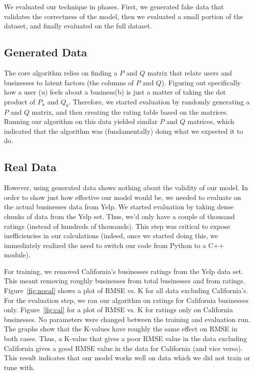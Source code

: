 We evaluated our technique in phases. First, we generated fake data that
validates the correctness of the model, then we evaluated a small portion of
the dataset, and finally evaluated on the full dataset.

\subsection{Generated Data}
The core algorithm relies on finding a $P$ and $Q$ matrix that relate users and
businesses to latent factors (the columns of $P$ and $Q$).  Figuring out
specifically how a user (u) feels about a business(b) is just a matter of
taking the dot product of $P_u$ and $Q_b$.  Therefore, we started evaluation by
randomly generating a $P$ and $Q$ matrix, and then creating the rating table
based on the matrices. Running our algorithm on this data yielded similar $P$
and $Q$ matrices, which indicated that the algorithm was (fundamentally) doing
what we expected it to do.

\subsection{Real Data}
However, using generated data shows nothing about the validity of our model. In
order to show just how effective our model would be, we needed to evaluate on
the actual businesses data from Yelp. We started evaluation by taking dense
chunks of data from the Yelp set. Thus, we'd only have a couple of thousand
ratings (instead of hundreds of thousands).  This step was critical to expose
inefficiencies in our calculations (indeed, once we started doing this, we
immediately realized the need to switch our code from Python to a C++ module).

For training, we removed California's businesses ratings from the Yelp data
set. This meant removing roughly \numBusCA businesses from \numBusTotal total
businesses and \numRatingCA from \numRatingTotal ratings.
Figure~\ref{fig:nocal} shows a plot of RMSE vs. K for all data excluding
California's. For the evaluation step, we ran our algorithm on ratings for
California businesses only. Figure~\ref{fig:cal} for a plot of RMSE vs. K for
ratings only on California businesses. No parameters were changed between the
training and evaluation run. The graphs show that the K-values have roughly the
same effect on RMSE in both cases. Thus, a K-value that gives a poor RMSE value
in the data excluding California gives a good RMSE value in the data for
California (and vice versa). This result indicates that our model works well on
data which we did not train or tune with.

